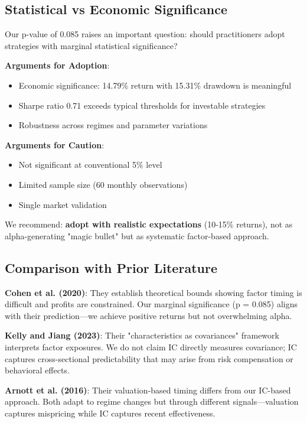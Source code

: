 \subsection{Statistical vs Economic Significance}

Our p-value of 0.085 raises an important question: should practitioners adopt strategies with marginal statistical significance?

\textbf{Arguments for Adoption}:
\begin{itemize}
    \item Economic significance: 14.79\% return with 15.31\% drawdown is meaningful
    \item Sharpe ratio 0.71 exceeds typical thresholds for investable strategies
    \item Robustness across regimes and parameter variations
\end{itemize}

\textbf{Arguments for Caution}:
\begin{itemize}
    \item Not significant at conventional 5\% level
    \item Limited sample size (60 monthly observations)
    \item Single market validation
\end{itemize}

We recommend: \textbf{adopt with realistic expectations} (10-15\% returns), not as alpha-generating "magic bullet" but as systematic factor-based approach.

\subsection{Comparison with Prior Literature}

\textbf{Cohen et al. (2020)}: They establish theoretical bounds showing factor timing is difficult and profits are constrained. Our marginal significance (p = 0.085) aligns with their prediction---we achieve positive returns but not overwhelming alpha.

\textbf{Kelly and Jiang (2023)}: Their "characteristics as covariances" framework interprets factor exposures. We do not claim IC directly measures covariance; IC captures cross-sectional predictability that may arise from risk compensation or behavioral effects.

\textbf{Arnott et al. (2016)}: Their valuation-based timing differs from our IC-based approach. Both adapt to regime changes but through different signals---valuation captures mispricing while IC captures recent effectiveness.

